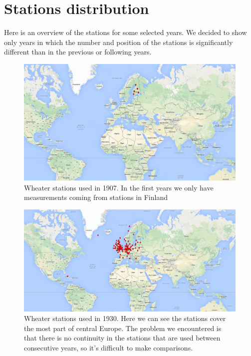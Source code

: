 \documentclass{vldb}
\begin{document}
\clearpage

\appendix
\section{Stations distribution} \label{App:AppendixA}
Here is an overview of the stations for some selected years. We decided to show only years in which the number and position of the stations is significantly different than in the previous or following years.

\begin{figure}[tbh]

\includegraphics[width=1\linewidth]{stations1907}
\caption{Wheater stations used in 1907. In the first years we only have measurements coming from stations in Finland}
\label{fig:stations1907}
\end{figure}

\begin{figure}[tbh]
\includegraphics[width=1\linewidth]{stations1930}
\caption{Wheater stations used in 1930. Here we can see the stations cover the most part of central Europe. The problem we encountered is that there is no continuity in the stations that are used between consecutive years, so it's difficult to make comparisons.}
\label{fig:stations1930}
\end{figure}
\end{document}
